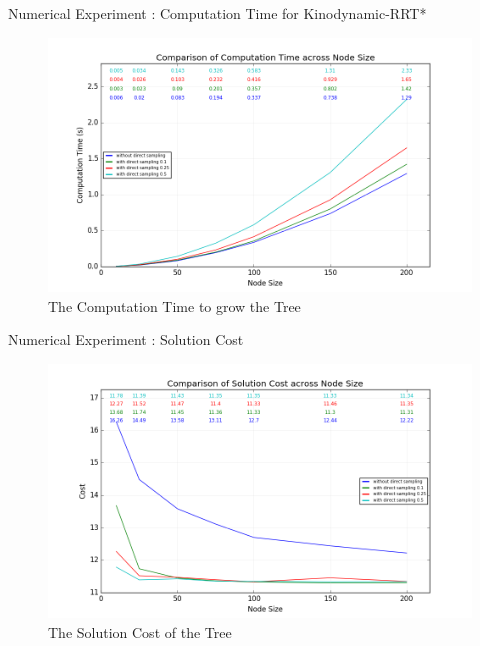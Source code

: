 \documentclass{beamer}
\begin{document}
\begin{frame}{Numerical Experiment : Computation Time for Kinodynamic-RRT*}
\begin{figure}[H]
	\centering
	\includegraphics[width=\linewidth]{assets/plot_time_all}
	\caption{The Computation Time to grow the Tree}
	\label{plot_compare_all:time}
\end{figure}
\end{frame}

\begin{frame}{Numerical Experiment : Solution Cost}
\begin{figure}[H]
	\centering
	\includegraphics[width=\linewidth]{assets/plot_cost_all}
	\caption{The Solution Cost of the Tree}
	\label{plot_compare_all:cost}
\end{figure}
\end{frame}
\end{document}
